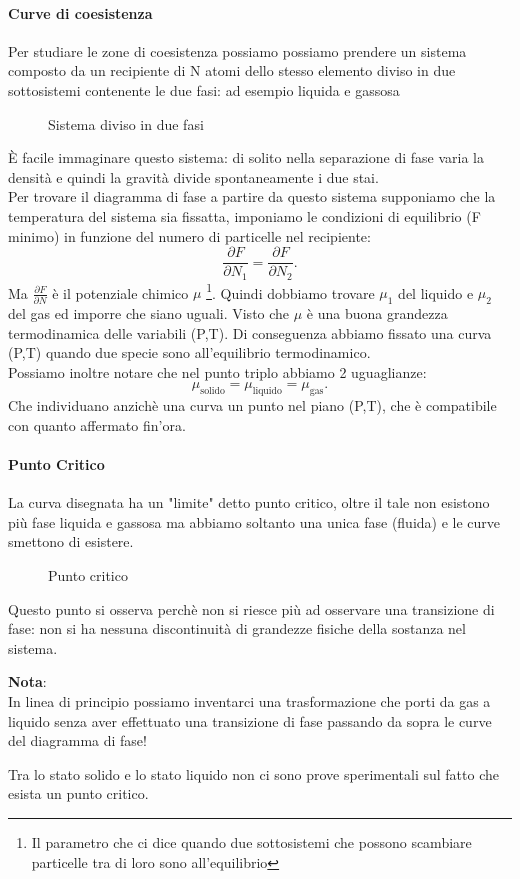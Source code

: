 \paragraph{Curve di coesistenza}%
Per studiare le zone di coesistenza possiamo possiamo prendere un sistema composto da un recipiente di N atomi dello stesso elemento diviso in due sottosistemi contenente le due fasi: ad esempio liquida e gassosa\\
\begin{figure}[H]
    \centering
    \caption{Sistema diviso in due fasi}
    \label{fig:sistema-diviso-in-due-fasi}
\end{figure}
\noindent
È facile immaginare questo sistema: di solito nella separazione di fase varia la densità e quindi la gravità divide spontaneamente i due stai.\\
Per trovare il diagramma di fase a partire da questo sistema supponiamo che la temperatura del sistema sia fissatta, imponiamo le condizioni di equilibrio (F minimo) in funzione del numero di particelle nel recipiente:
\[
	\frac{\partial F}{\partial N_1} = \frac{\partial F}{\partial N_2} 
.\] 
Ma $\frac{\partial F}{\partial N} $ è il potenziale chimico $\mu$ \footnote{Il parametro che ci dice quando due sottosistemi che possono scambiare particelle tra di loro sono all'equilibrio}.
Quindi dobbiamo trovare $\mu_1$ del liquido e $\mu_2$ del gas ed imporre che siano uguali. Visto che $\mu$ è una buona grandezza termodinamica delle variabili (P,T).  Di conseguenza abbiamo fissato una curva (P,T) quando due specie sono all'equilibrio termodinamico.\\
Possiamo inoltre notare che nel punto triplo abbiamo 2 uguaglianze:
\[
	\mu_{\text{solido}}=\mu_{\text{liquido}}= \mu_{\text{gas}}
.\] 
Che individuano anzichè una curva un punto nel piano (P,T), che è compatibile con quanto affermato fin'ora.

\paragraph{Punto Critico}%
La curva disegnata ha un "limite" detto punto critico, oltre il tale non esistono più fase liquida e gassosa ma abbiamo soltanto una unica fase (fluida) e le curve smettono di esistere. 
\begin{figure}[H]
    \centering
    \caption{Punto critico}
    \label{fig:punto-critico}
\end{figure}
\noindent
Questo punto si osserva perchè non si riesce più ad osservare una transizione di fase: non si ha nessuna discontinuità di grandezze fisiche della sostanza nel sistema.
\begin{framed}
\noindent \textbf{Nota}: \\
In linea di principio possiamo inventarci una trasformazione che porti da gas a liquido senza aver effettuato una transizione di fase passando da sopra le curve del diagramma di fase! 
\end{framed}
\noindent 
Tra lo stato solido e lo stato liquido non ci sono prove sperimentali sul fatto che esista un punto critico. 

